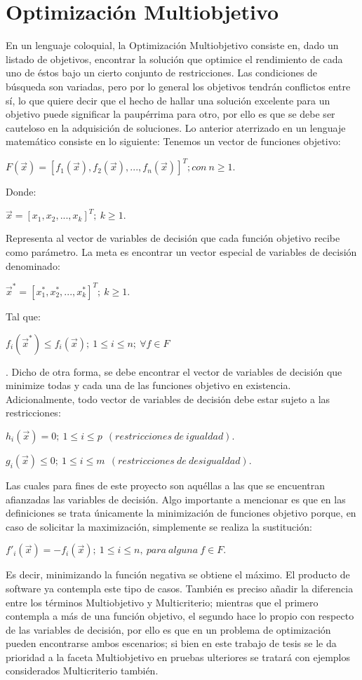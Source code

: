 \documentclass[class=report, crop=false]{standalone}
\begin{document}
\section{Optimización Multiobjetivo}
En un lenguaje coloquial, la Optimización Multiobjetivo consiste 
en, dado un listado de objetivos, encontrar la solución que 
optimice el rendimiento de cada uno de éstos bajo un cierto 
conjunto de restricciones. Las condiciones de búsqueda son 
variadas, pero por lo general los objetivos tendrán conflictos 
entre sí, lo que quiere decir que el hecho de hallar una solución 
excelente para un objetivo puede significar la paupérrima para 
otro, por ello es que se debe ser cauteloso en la adquisición 
de soluciones.\medskip\break
Lo anterior aterrizado en un lenguaje matemático consiste en lo 
siguiente:
Tenemos un vector de funciones objetivo:\medskip\break
\centerline{$F(\vec{x}) = [f_1(\vec{x}),f_2(\vec{x}),...,f_n(\vec{x})]^T; con\ n \geqslant 1.$}\medskip\break
Donde:\medskip\break
\centerline{$\vec{x} = [x_1,x_2,...,x_k]^T;\ k \geqslant 1.$}\medskip\break
Representa al vector de variables de decisión que cada función 
objetivo recibe como parámetro.
La meta es encontrar un vector especial de variables de decisión 
denominado:\medskip\break
\centerline{$\vec{x}^{*} = [x_1^{*},x_2^{*},...,x_k^{*}]^T;\ k \geqslant 1.$}
Tal que:\medskip\break
\centerline{$f_i(\vec{x}^{*}) \leqslant f_i(\vec{x});\ 1 \leqslant i \leqslant n;\ \forall f \in F$}.\medskip\break
Dicho de otra forma, se debe encontrar el vector de variables de 
decisión que minimize todas y cada una de las funciones objetivo 
en existencia.
Adicionalmente, todo vector de variables de decisión debe estar 
sujeto a las restricciones:\medskip\break
\centerline{$h_i(\vec{x}) = 0;\ 1 \leqslant i \leqslant p\ \ (restricciones\ de\ igualdad).$}
\centerline{$g_i(\vec{x}) \leqslant 0;\ 1 \leqslant i \leqslant m\ \ (restricciones\ de\ desigualdad).$}\medskip\break
Las cuales para fines de este proyecto son aquéllas a las que 
se encuentran afianzadas las variables de decisión.\medskip\break
Algo importante a mencionar es que en las definiciones se trata 
únicamente la minimización de funciones objetivo porque, en caso 
de solicitar la maximización, simplemente se realiza la sustitución:\medskip\break
\centerline{$f'_i(\vec{x}) = -f_i(\vec{x});\ 1 \leqslant i \leqslant n,\ para\ alguna\ f \in F.$}\medskip\break
Es decir, minimizando la función negativa se obtiene el máximo. 
El producto de software ya contempla este tipo de casos.\medskip\break
También es preciso añadir la diferencia entre los términos 
Multiobjetivo y Multicriterio; mientras que el primero contempla 
a más de una función objetivo, el segundo hace lo propio con 
respecto de las variables de decisión, por ello es que en un 
problema de optimización pueden encontrarse ambos escenarios; 
si bien en este trabajo de tesis se le da prioridad a la faceta 
Multiobjetivo en pruebas ulteriores se tratará con ejemplos 
considerados Multicriterio también.
\end{document}
